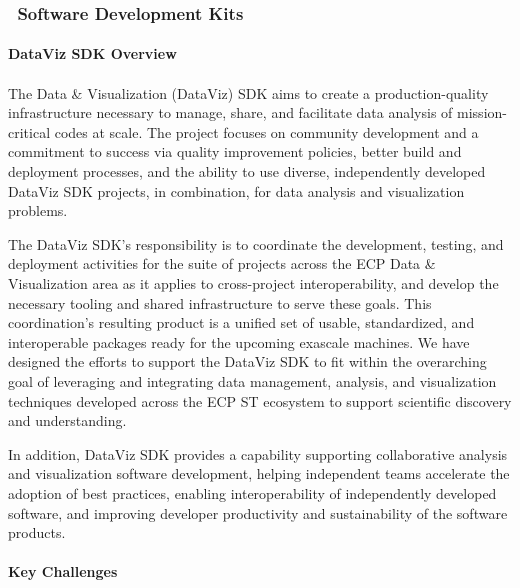 \subsubsection{ \dataviz\ Software Development Kits} 

\paragraph{\textbf{DataViz SDK Overview}}
\paragraph{}

The Data \& Visualization (DataViz) SDK aims to create a production-quality infrastructure necessary to manage, share, and facilitate data analysis of mission-critical codes at scale. The project focuses on community development and a commitment to success via quality improvement policies, better build and deployment processes, and the ability to use diverse, independently developed DataViz SDK projects, in combination, for data analysis and visualization problems.

The DataViz SDK's responsibility is to coordinate the development, testing, and deployment activities for the suite of projects across the ECP Data \& Visualization area as it applies to cross-project interoperability, and develop the necessary tooling and shared infrastructure to serve these goals. This coordination's resulting product is a unified set of usable, standardized, and interoperable packages ready for the upcoming exascale machines. We have designed the efforts to support the DataViz SDK to fit within the overarching goal of leveraging and integrating data management, analysis, and visualization techniques developed across the ECP ST ecosystem to support scientific discovery and understanding.

In addition, DataViz SDK provides a capability supporting collaborative analysis and visualization software development, helping independent teams accelerate the adoption of best practices, enabling interoperability of independently developed software, and improving developer productivity and sustainability of the software products.

\paragraph{\textbf{Key Challenges}}
\paragraph{}

